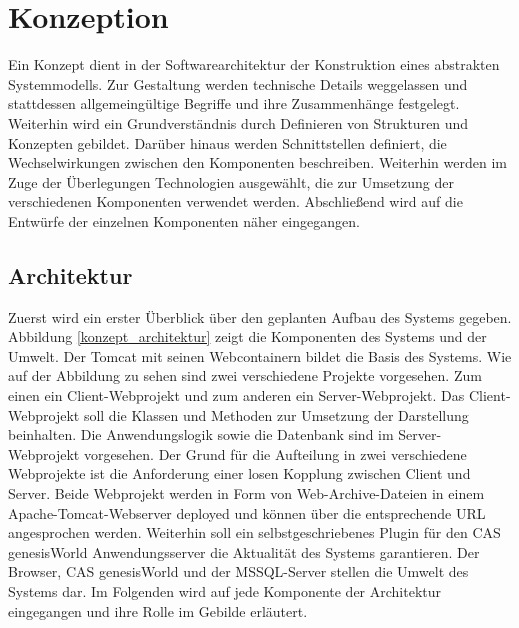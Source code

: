 
\chapter{Konzeption}
\label{ch:Konzeption}

Ein Konzept dient in der Softwarearchitektur der Konstruktion eines abstrakten Systemmodells. Zur Gestaltung werden technische Details weggelassen und stattdessen allgemeingültige Begriffe und ihre Zusammenhänge festgelegt. Weiterhin wird ein Grundverständnis durch Definieren von Strukturen und Konzepten gebildet. Darüber hinaus werden Schnittstellen definiert, die Wechselwirkungen zwischen den Komponenten beschreiben. Weiterhin werden im Zuge der Überlegungen Technologien ausgewählt, die zur Umsetzung der verschiedenen Komponenten verwendet werden. Abschließend wird auf die Entwürfe der einzelnen Komponenten näher eingegangen.  

\section{Architektur}

Zuerst wird ein erster Überblick über den geplanten Aufbau des Systems gegeben. Abbildung \ref{konzept_architektur} zeigt die Komponenten des Systems und der Umwelt. Der Tomcat mit seinen Webcontainern bildet die Basis des Systems. Wie auf der Abbildung zu sehen sind zwei verschiedene Projekte vorgesehen. Zum einen ein Client-Webprojekt und zum anderen ein Server-Webprojekt. Das Client-Webprojekt soll die Klassen und Methoden zur Umsetzung der Darstellung beinhalten. Die Anwendungslogik sowie die Datenbank sind im Server-Webprojekt vorgesehen. Der Grund für die Aufteilung in zwei verschiedene Webprojekte ist die Anforderung einer losen Kopplung zwischen Client und Server. Beide Webprojekt werden in Form von Web-Archive-Dateien in einem Apache-Tomcat-Webserver deployed und können über die entsprechende URL angesprochen werden. Weiterhin soll ein selbstgeschriebenes Plugin für den CAS genesisWorld Anwendungsserver die Aktualität des Systems garantieren. Der Browser, CAS genesisWorld und der MSSQL-Server stellen die Umwelt des Systems dar. Im Folgenden wird auf jede Komponente der Architektur eingegangen und ihre Rolle im Gebilde erläutert.

